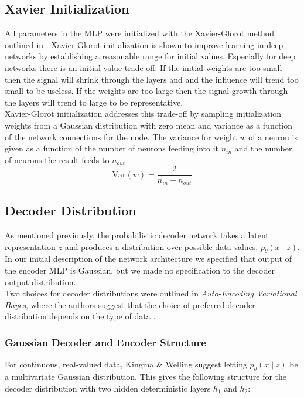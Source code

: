 \documentclass{article} %
\begin{document}
\subsection{Xavier Initialization}
All parameters in the MLP were initialized with the Xavier-Glorot method outlined in \cite{Glorot2010}. Xavier-Glorot initialization is shown to improve learning in deep networks by establishing a reasonable range for initial values. Especially for deep networks there is an initial value trade-off. If the initial weights are too small then the signal will shrink through the layers and and the influence will trend too small to be useless. If the weights are too large then the signal growth through the layers will trend to large to be representative.\\
Xavier-Glorot initialization addresses this trade-off by sampling initialization weights from a Gaussian distribution with zero mean and variance as a function of the network connections for the node. The variance for weight $w$  of a neuron is given as a function of the number of neurons feeding into it $n_{in}$ and the number of neurons the result feeds to $n_{out}$
\begin{equation*}
    \text{Var}(w) = \frac{2}{n_{in}+n_{out}}
\end{equation*}


\subsection{Decoder Distribution}


As mentioned previously, the probabilistic decoder network takes a latent representation $z$ and produces a distribution over possible data values, ${p_\theta(x\mid z)}$. In our initial description of the network architecture we specified that output of the encoder MLP is Gaussian, but we made no specification to the decoder output distribution. \\
Two choices for decoder distributions were outlined in \textit{Auto-Encoding Variational Bayes}, where the authors suggest that the choice of preferred decoder distribution depends on the type of data \cite{Kingma2013}. \\

\subsubsection{Gaussian Decoder and Encoder Structure}
For continuous, real-valued data, Kingma \& Welling suggest letting ${p_\theta(x\mid z)}$ be a multivariate Gaussian distribution. This gives the following structure for the decoder distribution with two hidden deterministic layers $h_1$ and $h_2$:
\end{document}
